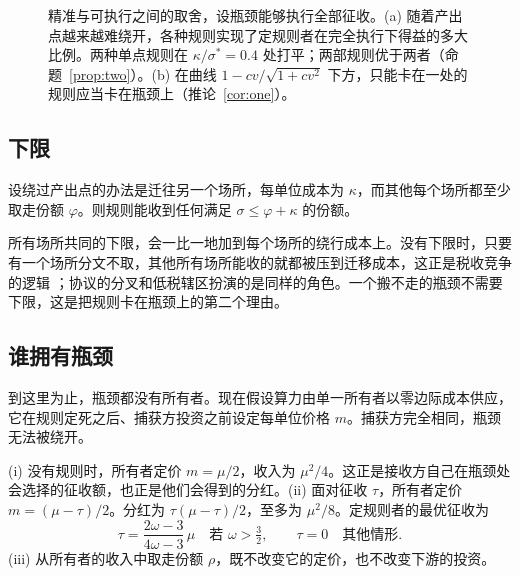 \begin{figure}[t]
\caption{精准与可执行之间的取舍，设瓶颈能够执行全部征收。(a) 随着产出点越来越难绕开，各种规则实现了定规则者在完全执行下得益的多大比例。两种单点规则在 $\kappa/\sigma^*=0.4$ 处打平；两部规则优于两者（命题~\ref{prop:two}）。(b) 在曲线 $1-cv/\sqrt{1+cv^2}$ 下方，只能卡在一处的规则应当卡在瓶颈上（推论~\ref{cor:one}）。}
\label{fig:main}
\end{figure}

\subsection{下限}

\begin{proposition}[下限]\label{prop:floor}
设绕过产出点的办法是迁往另一个场所，每单位成本为 $\kappa$，而其他每个场所都至少取走份额
$\varphi$。则规则能收到任何满足 $\sigma\le\varphi+\kappa$ 的份额。
\end{proposition}

所有场所共同的下限，会一比一地加到每个场所的绕行成本上。没有下限时，只要有一个场所分文不取，其他所有场所能收的就都被压到迁移成本，这正是税收竞争的逻辑
\citep{KeenKonrad2013}；协议的分叉和低税辖区扮演的是同样的角色。一个搬不走的瓶颈不需要下限，这是把规则卡在瓶颈上的第二个理由。

\subsection{谁拥有瓶颈}

到这里为止，瓶颈都没有所有者。现在假设算力由单一所有者以零边际成本供应，它在规则定死之后、捕获方投资之前设定每单位价格 $m$。捕获方完全相同，瓶颈无法被绕开。

\begin{proposition}[瓶颈的所有者]\label{prop:owner}
(i) 没有规则时，所有者定价 $m=\mu/2$，收入为 $\mu^2/4$。这正是接收方自己在瓶颈处会选择的征收额，也正是他们会得到的分红。(ii) 面对征收 $\tau$，所有者定价 $m=(\mu-\tau)/2$。分红为 $\tau(\mu-\tau)/2$，至多为 $\mu^2/8$。定规则者的最优征收为
\begin{equation}
  \tau=\frac{2\omega-3}{4\omega-3}\,\mu \quad\text{若 }\omega>\tfrac32,
  \qquad \tau=0\quad\text{其他情形}.
\end{equation}
(iii) 从所有者的收入中取走份额 $\rho$，既不改变它的定价，也不改变下游的投资。
\end{proposition}

